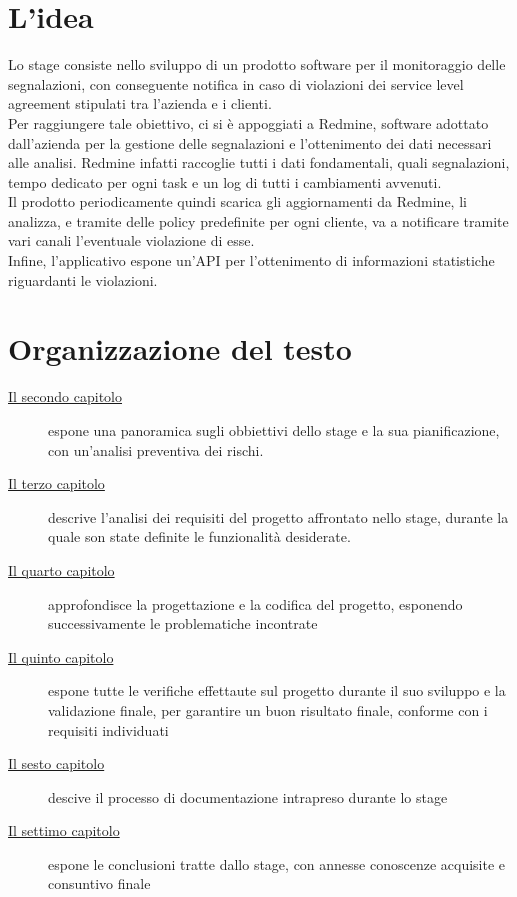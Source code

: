 \section{L'idea}

Lo stage consiste nello sviluppo di un prodotto software per il monitoraggio delle segnalazioni, con conseguente notifica in caso di violazioni dei service level agreement stipulati tra l'azienda e i clienti.\\
Per raggiungere tale obiettivo, ci si è appoggiati a Redmine, software adottato dall'azienda per la gestione delle segnalazioni e l'ottenimento dei dati necessari alle analisi. Redmine infatti raccoglie tutti i dati fondamentali, quali segnalazioni, tempo dedicato per ogni task e un log di tutti i cambiamenti avvenuti. \\
Il prodotto periodicamente quindi scarica gli aggiornamenti da Redmine, li analizza, e tramite delle policy predefinite per ogni cliente, va a notificare tramite vari canali l'eventuale violazione di esse. \\
Infine, l'applicativo espone un'API per l'ottenimento di informazioni statistiche riguardanti le violazioni. 

\section{Organizzazione del testo}

\begin{description}
    \item[{\hyperref[cap:descrizione-stage]{Il secondo capitolo}}] espone una panoramica sugli obbiettivi dello stage e la sua pianificazione, con un'analisi preventiva dei rischi.
    
    \item[{\hyperref[cap:analisi-requisiti]{Il terzo capitolo}}] descrive l'analisi dei requisiti del progetto affrontato nello stage, durante la quale son state definite le funzionalità desiderate.
    
    \item[{\hyperref[cap:progettazione-codifica]{Il quarto capitolo}}] approfondisce la progettazione e la codifica del progetto, esponendo successivamente le problematiche incontrate
    
    \item[{\hyperref[cap:verifica-validazione]{Il quinto capitolo}}] 
    espone tutte le verifiche effettaute sul progetto durante il suo sviluppo e la validazione finale, per garantire un buon risultato finale, conforme con i requisiti individuati
    
    \item[{\hyperref[cap:documentazione]{Il sesto capitolo}}] descive il processo di documentazione intrapreso durante lo stage
    
    \item[{\hyperref[cap:conclusioni]{Il settimo capitolo}}] espone le conclusioni tratte dallo stage, con annesse conoscenze acquisite e consuntivo finale
\end{description}

